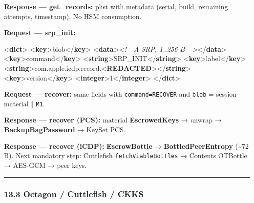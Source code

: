 \documentclass[
  english,
  10pt]{article}
\newenvironment{Shaded}{}{}
\newcommand{\CommentTok}[1]{\textcolor[rgb]{0.38,0.63,0.69}{\textit{#1}}}
\newcommand{\KeywordTok}[1]{\textcolor[rgb]{0.00,0.44,0.13}{\textbf{#1}}}
\newcommand{\NormalTok}[1]{#1}
\begin{document}
\textbf{Response --- get\_records:} plist with metadata (serial, build,
remaining attempts, timestamp). No HSM consumption.

\textbf{Request --- srp\_init:}

\begin{Shaded}
\begin{Highlighting}[]
\NormalTok{\textless{}}\KeywordTok{dict}\NormalTok{\textgreater{}}
\NormalTok{  \textless{}}\KeywordTok{key}\NormalTok{\textgreater{}blob\textless{}/}\KeywordTok{key}\NormalTok{\textgreater{}    \textless{}}\KeywordTok{data}\NormalTok{\textgreater{}}\CommentTok{\textless{}!{-}{-} A SRP, 1..256 B {-}{-}\textgreater{}}\NormalTok{\textless{}/}\KeywordTok{data}\NormalTok{\textgreater{}}
\NormalTok{  \textless{}}\KeywordTok{key}\NormalTok{\textgreater{}command\textless{}/}\KeywordTok{key}\NormalTok{\textgreater{} \textless{}}\KeywordTok{string}\NormalTok{\textgreater{}SRP\_INIT\textless{}/}\KeywordTok{string}\NormalTok{\textgreater{}}
\NormalTok{  \textless{}}\KeywordTok{key}\NormalTok{\textgreater{}label\textless{}/}\KeywordTok{key}\NormalTok{\textgreater{}   \textless{}}\KeywordTok{string}\NormalTok{\textgreater{}com.apple.icdp.record.\textless{}}\KeywordTok{REDACTED}\NormalTok{\textgreater{}\textless{}/}\KeywordTok{string}\NormalTok{\textgreater{}}
\NormalTok{  \textless{}}\KeywordTok{key}\NormalTok{\textgreater{}version\textless{}/}\KeywordTok{key}\NormalTok{\textgreater{} \textless{}}\KeywordTok{integer}\NormalTok{\textgreater{}1\textless{}/}\KeywordTok{integer}\NormalTok{\textgreater{}}
\NormalTok{\textless{}/}\KeywordTok{dict}\NormalTok{\textgreater{}}
\end{Highlighting}
\end{Shaded}

\textbf{Request --- recover:} same fields with \texttt{command=RECOVER}
and \texttt{blob} = session material ‖ \texttt{M1}.

\textbf{Response --- recover (PCS):} material \textbf{EscrowedKeys} →
unwrap → \textbf{BackupBagPassword} → KeySet PCS.

\textbf{Response --- recover (iCDP):} \textbf{EscrowBottle} →
\textbf{BottledPeerEntropy} (\textasciitilde72 B). Next mandatory step:
Cuttlefish \texttt{fetchViableBottles} → Contents OTBottle → AES-GCM →
peer keys.

\begin{center}\rule{0.5\linewidth}{0.5pt}\end{center}

\subsubsection{13.3 Octagon / Cuttlefish /
CKKS}\label{octagon-cuttlefish-ckks}
\end{document}
